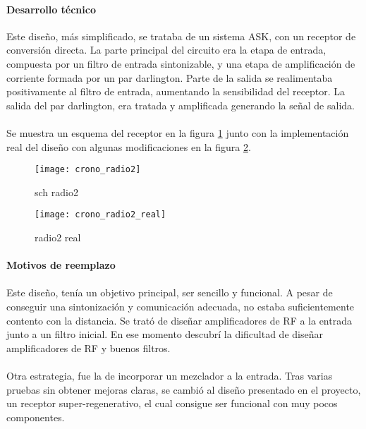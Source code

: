 \paragraph{Desarrollo técnico}
Este diseño, más simplificado, se trataba de un sistema ASK, con un receptor de conversión directa. 
La parte principal del circuito era la etapa de entrada, compuesta por un filtro de entrada sintonizable, y una etapa de amplificación de corriente formada por un par darlington. Parte de la salida se realimentaba positivamente al filtro de entrada, aumentando la sensibilidad del receptor. La salida del par darlington, era tratada y amplificada generando la señal de salida. 
\paragraph{}
Se muestra un esquema del receptor en la figura \ref{fig:crono_radio2} junto con la implementaci\'on real del diseño con algunas modificaciones en la figura \ref{fig:crono_radio2_real}.
\begin{figure}[h!]
    \centering
    \texttt{[image: crono\_radio2]}
    \caption{sch radio2}
    \label{fig:crono_radio2}
\end{figure}

\begin{figure}[h!]
    \centering
    \texttt{[image: crono\_radio2\_real]}
    \caption{radio2 real}
    \label{fig:crono_radio2_real}
\end{figure}

\paragraph{Motivos de reemplazo}
\paragraph{}
Este diseño, tenía un objetivo principal, ser sencillo y funcional.
A pesar de conseguir una sintonización y comunicación adecuada, no estaba suficientemente contento con la distancia. Se trató de diseñar amplificadores de RF a la entrada junto a un filtro inicial. En ese momento descubrí la dificultad de diseñar amplificadores de RF y buenos filtros. 
\paragraph{}
Otra estrategia, fue la de incorporar un mezclador a la entrada. Tras varias pruebas sin obtener mejoras claras, se cambió al diseño presentado en el proyecto, un receptor super-regenerativo, el cual consigue ser funcional con muy pocos componentes.

